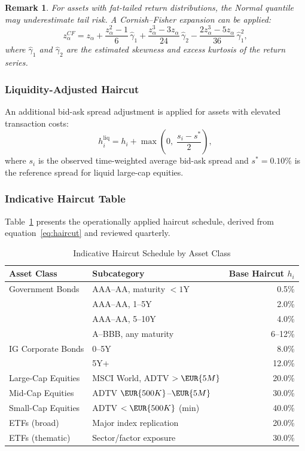 \documentclass[12pt, a4paper]{article}
\newtheorem{remark}{Remark}[section]
\newcommand{\1}{\mathbbm{1}}
\begin{document}
\begin{remark}
    For assets with fat-tailed return distributions, the Normal quantile may
    underestimate tail risk. A Cornish--Fisher expansion can be applied:
    \[
    z_\alpha^{CF} = z_\alpha + \frac{z_\alpha^2 - 1}{6}\,\hat{\gamma}_1
    + \frac{z_\alpha^3 - 3z_\alpha}{24}\,\hat{\gamma}_2
    - \frac{2z_\alpha^3 - 5z_\alpha}{36}\,\hat{\gamma}_1^2,
    \]
    where $\hat{\gamma}_1$ and $\hat{\gamma}_2$ are the estimated skewness and
    excess kurtosis of the return series.
\end{remark}

\subsubsection*{Liquidity-Adjusted Haircut}

An additional bid-ask spread adjustment is applied for assets with elevated
transaction costs:
\begin{equation}
    h_i^{\mathrm{liq}} = h_i + \max\!\left(0,\;\frac{s_i - s^*}{2}\right),
    \label{eq:liq_haircut}
\end{equation}
where $s_i$ is the observed time-weighted average bid-ask spread and $s^* =
0.10\%$ is the reference spread for liquid large-cap equities.

\subsubsection*{Indicative Haircut Table}

Table~\ref{tab:haircuts} presents the operationally applied haircut schedule,
derived from equation~\eqref{eq:haircut} and reviewed quarterly.

\begin{table}[H]
\centering
\caption{Indicative Haircut Schedule by Asset Class}
\label{tab:haircuts}
\begin{tabular}{llr}
\toprule
\textbf{Asset Class} & \textbf{Subcategory} & \textbf{Base Haircut $h_i$} \\
\midrule
Government Bonds & AAA--AA, maturity $< 1$Y     & 0.5\% \\
                 & AAA--AA, 1--5Y                & 2.0\% \\
                 & AAA--AA, 5--10Y               & 4.0\% \\
                 & A--BBB, any maturity          & 6--12\% \\
IG Corporate Bonds & 0--5Y                       & 8.0\% \\
                   & 5Y+                         & 12.0\% \\
Large-Cap Equities & MSCI World, ADTV $> \EUR{5M}$ & 20.0\% \\
Mid-Cap Equities   & ADTV $\EUR{500K}$--$\EUR{5M}$ & 30.0\% \\
Small-Cap Equities & ADTV $< \EUR{500K}$ (min)   & 40.0\% \\
ETFs (broad)       & Major index replication     & 20.0\% \\
ETFs (thematic)    & Sector/factor exposure      & 30.0\% \\
\bottomrule
\end{tabular}
\end{table}
\end{document}
